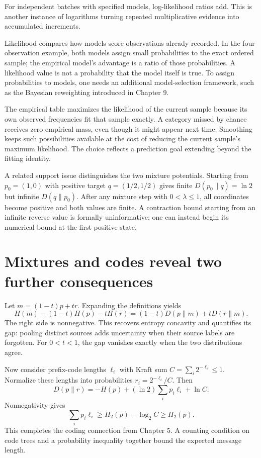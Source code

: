 \documentclass[11pt,oneside,openany]{book}
\theoremstyle{definition}
\theoremstyle{remark}
\numberwithin{equation}{chapter}
\begin{document}
For independent batches with specified models, log-likelihood ratios add. This is another instance of logarithms turning repeated multiplicative evidence into accumulated increments.

Likelihood compares how models score observations already recorded. In the four-observation example, both models assign small probabilities to the exact ordered sample; the empirical model's advantage is a ratio of those probabilities. A likelihood value is not a probability that the model itself is true. To assign probabilities to models, one needs an additional model-selection framework, such as the Bayesian reweighting introduced in Chapter 9.

The empirical table maximizes the likelihood of the current sample because its own observed frequencies fit that sample exactly. A category missed by chance receives zero empirical mass, even though it might appear next time. Smoothing keeps such possibilities available at the cost of reducing the current sample's maximum likelihood. The choice reflects a prediction goal extending beyond the fitting identity.

A related support issue distinguishes the two mixture potentials. Starting from \(p_0=(1,0)\) with positive target \(q=(1/2,1/2)\) gives finite \(D(p_0\|q)=\ln2\) but infinite \(D(q\|p_0)\). After any mixture step with \(0<\lambda\leq1\), all coordinates become positive and both values are finite. A contraction bound starting from an infinite reverse value is formally uninformative; one can instead begin its numerical bound at the first positive state.

\section{Mixtures and codes reveal two further consequences}\label{ch06-mixtures-and-codes-reveal-two-further-consequences}

Let \(m=(1-t)p+tr\). Expanding the definitions yields \[H(m)-(1-t)H(p)-tH(r)
=(1-t)D(p\|m)+tD(r\|m).\] The right side is nonnegative. This recovers entropy concavity and quantifies its gap: pooling distinct sources adds uncertainty when their source labels are forgotten. For \(0<t<1\), the gap vanishes exactly when the two distributions agree.

Now consider prefix-code lengths \(\ell_i\) with Kraft sum \(C=\sum_i2^{-\ell_i}\leq1\). Normalize these lengths into probabilities \(r_i=2^{-\ell_i}/C\). Then \[D(p\|r)=-H(p)+(\ln2)\sum_i p_i\ell_i+\ln C.\] Nonnegativity gives \[\sum_i p_i\ell_i\geq H_2(p)-\log_2C\geq H_2(p).\] This completes the coding connection from Chapter 5. A counting condition on code trees and a probability inequality together bound the expected message length.
\end{document}
